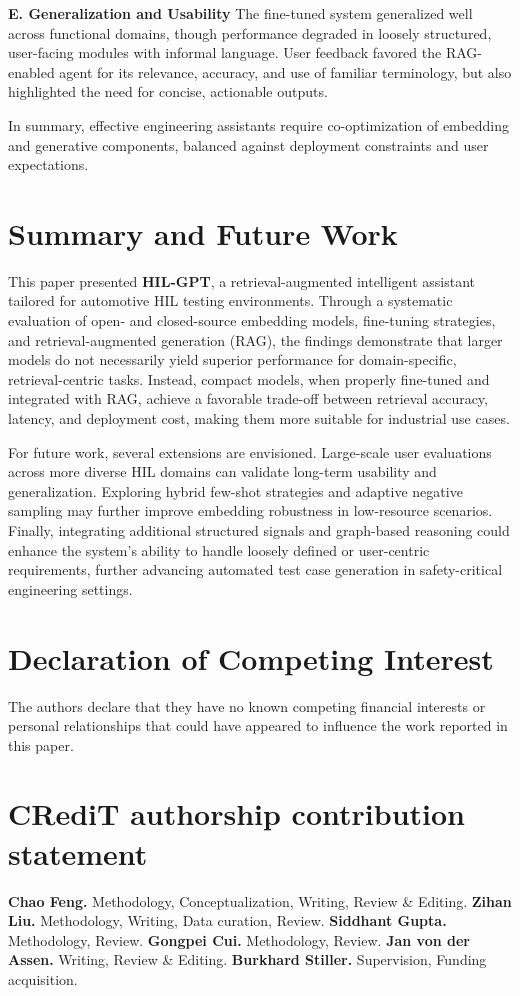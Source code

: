 \documentclass[a4paper,fleqn]{cas-dc}
\begin{document}
\textbf{E. Generalization and Usability} The fine-tuned system generalized well across functional domains, though performance degraded in loosely structured, user-facing modules with informal language. User feedback favored the RAG-enabled agent for its relevance, accuracy, and use of familiar terminology, but also highlighted the need for concise, actionable outputs.

In summary, effective engineering assistants require co-optimization of embedding and generative components, balanced against deployment constraints and user expectations.

\section{Summary and Future Work}
\label{sec:summary}
This paper presented \textbf{HIL-GPT}, a retrieval-augmented intelligent assistant tailored for automotive HIL testing environments. Through a systematic evaluation of open- and closed-source embedding models, fine-tuning strategies, and retrieval-augmented generation (RAG), the findings demonstrate that larger models do not necessarily yield superior performance for domain-specific, retrieval-centric tasks. Instead, compact models, when properly fine-tuned and integrated with RAG, achieve a favorable trade-off between retrieval accuracy, latency, and deployment cost, making them more suitable for industrial use cases.

For future work, several extensions are envisioned. Large-scale user evaluations across more diverse HIL domains can validate long-term usability and generalization. Exploring hybrid few-shot strategies and adaptive negative sampling may further improve embedding robustness in low-resource scenarios. Finally, integrating additional structured signals and graph-based reasoning could enhance the system’s ability to handle loosely defined or user-centric requirements, further advancing automated test case generation in safety-critical engineering settings.


\section*{Declaration of Competing Interest}
The authors declare that they have no known competing financial interests or personal relationships that could have appeared to influence the work reported in this paper. 

\section*{CRediT authorship contribution statement}
\textbf{Chao Feng.} Methodology, Conceptualization, Writing, Review \& Editing.
\textbf{Zihan Liu.} Methodology, Writing, Data curation, Review. 
\textbf{Siddhant Gupta.} Methodology, Review. 
\textbf{Gongpei Cui.} Methodology, Review. 
\textbf{Jan von der Assen.} Writing, Review \& Editing.
\textbf{Burkhard Stiller.} Supervision, Funding acquisition.
\end{document}
